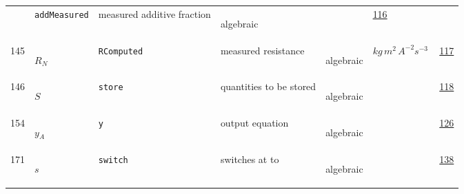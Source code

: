 \begin{longtable}{|p{1cm}|p{2.5cm}|p{4.5cm}|p{8cm}|p{3.0cm}|p{3cm}|p{1cm}|}
             & \verb|addMeasured|
             & measured additive fraction
             & \begin{lay}algebraic \end{lay}
             & $  $
             & \hyperlink{"e:116"}{ 116 }
                 \\
    145
             & \hypertarget{"v:145"}{ $ {R}{_{N}} $}
             & \verb|RComputed|
             & measured resistance 
             & \begin{lay}algebraic \end{lay}
             & $ kg \,m^{2} \,A^{-2} s^{-3} \, $
             & \hyperlink{"e:117"}{ 117 }
                 \\
    146
             & \hypertarget{"v:146"}{ $ {S}{_{}} $}
             & \verb|store|
             & quantities to be stored
             & \begin{lay}algebraic \end{lay}
             & $  $
             & \hyperlink{"e:118"}{ 118 }
                 \\
    154
             & \hypertarget{"v:154"}{ $ {y}{_{A}} $}
             & \verb|y|
             & output equation
             & \begin{lay}algebraic \end{lay}
             & $  $
             & \hyperlink{"e:126"}{ 126 }
                 \\
    171
             & \hypertarget{"v:171"}{ $ {s}{_{}} $}
             & \verb|switch|
             & switches at to
             & \begin{lay}algebraic \end{lay}
             & $  $
             & \hyperlink{"e:138"}{ 138 }
                 \\
    \end{longtable}